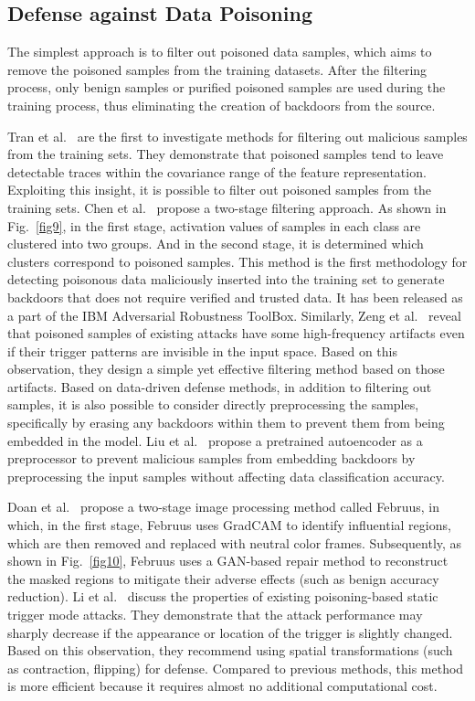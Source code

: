 \subsection{Defense against Data Poisoning}  
The simplest approach is to filter out poisoned data
samples, which aims to remove the poisoned samples from
the training datasets. After the filtering process, only
benign samples or purified poisoned samples are used
during the training process, thus eliminating the creation
of backdoors from the source.  

Tran et al.~\cite{tran2018spectral} are the first to investigate methods
for filtering out malicious samples from the training sets.
They demonstrate that poisoned samples tend to leave
detectable traces within the covariance range of the feature
representation. Exploiting this insight, it is possible to
filter out poisoned samples from the training sets. Chen et
al.~\cite{chen2018detecting} propose a two-stage filtering approach. As shown
in Fig.~\ref{fig9}, in the first stage, activation values of samples
in each class are clustered into two groups. And in the
second stage, it is determined which clusters correspond
to poisoned samples. This method is the first methodology
for detecting poisonous data maliciously inserted into the
training set to generate backdoors that does not require
verified and trusted data. It has been released as a part
of the IBM Adversarial Robustness ToolBox. Similarly,
Zeng et al.~\cite{zeng2021rethinking} reveal that poisoned samples of existing
attacks have some high-frequency artifacts even if their
trigger patterns are invisible in the input space. Based on
this observation, they design a simple yet effective filtering
method based on those artifacts. Based on data-driven defense methods, in addition
to filtering out samples, it is also possible to consider
directly preprocessing the samples, specifically by erasing
any backdoors within them to prevent them from being
embedded in the model. Liu et al.~\cite{liu2017neural} propose a 
pretrained autoencoder as a preprocessor to prevent malicious
samples from embedding backdoors by preprocessing the
input samples without affecting data classification accuracy.  

Doan et al.~\cite{doan2020februus} propose a two-stage image processing
method called Februus, in which, in the first stage, Februus
uses GradCAM to identify influential regions, which are
then removed and replaced with neutral color frames.
Subsequently, as shown in Fig.~\ref{fig10}, Februus uses a GAN-based
repair method to reconstruct the masked regions
to mitigate their adverse effects (such as benign accuracy
reduction). Li et al.~\cite{li2021backdoor} discuss the properties of existing
poisoning-based static trigger mode attacks. They 
demonstrate that the attack performance may sharply decrease
if the appearance or location of the trigger is slightly
changed. Based on this observation, they recommend using
spatial transformations (such as contraction, flipping) for
defense. Compared to previous methods, this method is
more eﬀicient because it requires almost no additional
computational cost.  

